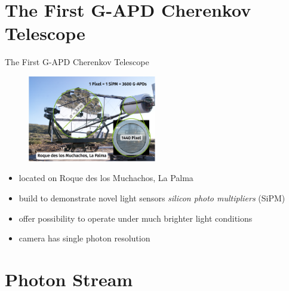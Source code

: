 



\maketitle

\section{The First G-APD Cherenkov Telescope}

\begin{frame}[t]{The First G-APD Cherenkov Telescope}
  \begin{multicols}{2}
    \vspace*{\fill}
    \begin{figure}
        \centering
        \includegraphics[width=0.5\textwidth]{fig/fact.png}
    \end{figure}
    \columnbreak
    \vspace*{\fill}
      \begin{itemize}
        \item located on Roque des los Muchachos, La Palma
        \item build to demonstrate novel light sensors \textit{silicon photo multipliers} (SiPM)
        \item offer possibility to operate under much brighter light conditions
        \item camera has single photon resolution
    \end{itemize}
    \vspace*{\fill}
  \end{multicols}
\end{frame}

\section{Photon Stream}


